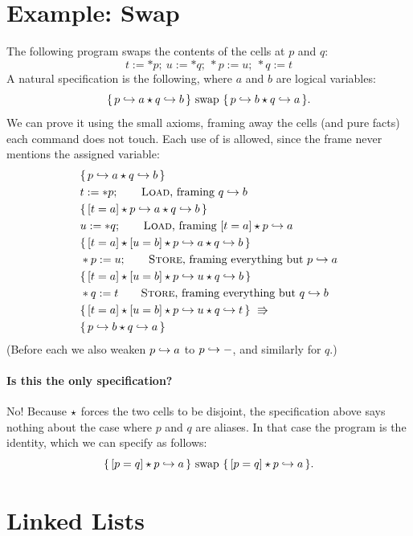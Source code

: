 \section{Example: Swap}
%
The following program swaps the contents of the cells at $p$ and $q$:
\[
  t:=\ast p;\ u:=\ast q;\ \ast p:=u;\ \ast q:=t
\]
A natural specification is the following, where $a$ and $b$ are logical variables:
\[
  \{\,p\hookrightarrow a\mathbin{\star} q\hookrightarrow b\,\}\ \mathrm{swap}\ \{\,p\hookrightarrow b\mathbin{\star} q\hookrightarrow a\,\}.
\]
We can prove it using the small axioms, framing away the cells (and pure facts) each command does
not touch. Each use of  is allowed, since the frame never mentions the assigned variable:
\begin{align*}
  &\{\,p\pto a\sep q\pto b\,\}\\
  &t:=\ast p;\qquad \text{\rn{Load}, framing } q\pto b\\
  &\{\,\pure{t=a}\sep p\pto a\sep q\pto b\,\}\\
  &u:=\ast q;\qquad \text{\rn{Load}, framing } \pure{t=a}\sep p\pto a\\
  &\{\,\pure{t=a}\sep\pure{u=b}\sep p\pto a\sep q\pto b\,\}\\
  &\ast p:=u;\qquad \text{\rn{Store}, framing everything but } p\pto a\\
  &\{\,\pure{t=a}\sep\pure{u=b}\sep p\pto u\sep q\pto b\,\}\\
  &\ast q:=t\qquad \text{\rn{Store}, framing everything but } q\pto b\\
  &\{\,\pure{t=a}\sep\pure{u=b}\sep p\pto u\sep q\pto t\,\}\ \entails\\
  &\{\,p\pto b\sep q\pto a\,\}
\end{align*}
(Before each  we also weaken $p\hookrightarrow a$ to $p\hookrightarrow-$, and similarly for $q$.)
%
\paragraph{Is this the only specification?} No! Because $\mathbin{\star}$ forces the two cells to be
disjoint, the specification above says nothing about the case where $p$ and $q$ are aliases. In
that case the program is the identity, which we can specify as follows:
\[
  \{\,[p=q]\mathbin{\star} p\hookrightarrow a\,\}\ \mathrm{swap}\ \{\,[p=q]\mathbin{\star} p\hookrightarrow a\,\}.
\]
%
\section{Linked Lists}
%
